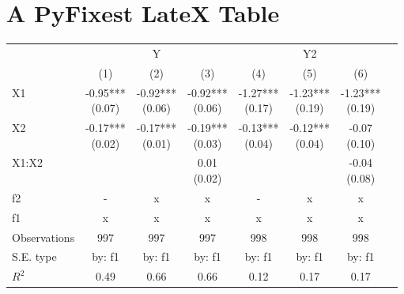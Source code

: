 \documentclass{article}%
\begin{document}
%
\normalsize%
\section{A PyFixest LateX Table}%
\label{sec:APyFixestLateXTable}%


\begin{table}[htbp]%
\renewcommand\cellalign{t}
\begin{threeparttable}
\begin{tabular}{lccccccc}
\toprule
 & \multicolumn{3}{c}{Y} & \multicolumn{3}{c}{Y2} \\
\cmidrule(lr){2-4} \cmidrule(lr){5-7}
 & (1) & (2) & (3) & (4) & (5) & (6) \\
\midrule
\addlinespace
X1 & \makecell{-0.95*** \\ (0.07)} & \makecell{-0.92*** \\ (0.06)} & \makecell{-0.92*** \\ (0.06)} & \makecell{-1.27*** \\ (0.17)} & \makecell{-1.23*** \\ (0.19)} & \makecell{-1.23*** \\ (0.19)} \\
X2 & \makecell{-0.17*** \\ (0.02)} & \makecell{-0.17*** \\ (0.01)} & \makecell{-0.19*** \\ (0.03)} & \makecell{-0.13*** \\ (0.04)} & \makecell{-0.12*** \\ (0.04)} & \makecell{-0.07 \\ (0.10)} \\
X1:X2 &  &  & \makecell{0.01 \\ (0.02)} &  &  & \makecell{-0.04 \\ (0.08)} \\
\midrule
\addlinespace
f2 & - & x & x & - & x & x \\
f1 & x & x & x & x & x & x \\
\midrule
\addlinespace
Observations & 997 & 997 & 997 & 998 & 998 & 998 \\
S.E. type & by: f1 & by: f1 & by: f1 & by: f1 & by: f1 & by: f1 \\
$R^2$ & 0.49 & 0.66 & 0.66 & 0.12 & 0.17 & 0.17 \\
\bottomrule
\end{tabular}
\footnotesize
\end{threeparttable}%
\end{table}

%
\end{document}
